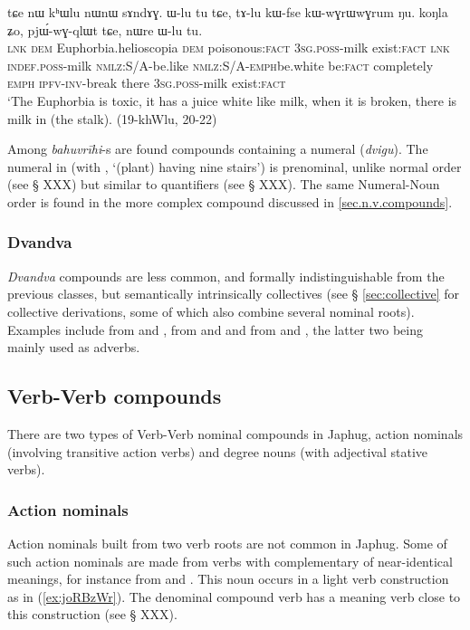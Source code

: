 \begin{exe}
\ex \label{ex:khWlu}  
\gll tɕe nɯ kʰɯlu nɯnɯ sɤndɤɣ. ɯ-lu tu tɕe, tɤ-lu kɯ-fse kɯ-wɣrɯ\redp{}wɣrum ŋu. koŋla ʑo, pjɯ́-wɣ-qlɯt tɕe, nɯre ɯ-lu tu. \\
\textsc{lnk} \textsc{dem} Euphorbia.helioscopia \textsc{dem} poisonous:\textsc{fact} \textsc{3sg.poss}-milk exist:\textsc{fact} \textsc{lnk}  \textsc{indef.poss}-milk \textsc{nmlz}:S/A-be.like \textsc{nmlz}:S/A-\textsc{emph}\redp{}be.white be:\textsc{fact} completely \textsc{emph} \textsc{ipfv}-\textsc{inv}-break there \textsc{3sg.poss}-milk exist:\textsc{fact} \\
\glt `The Euphorbia is toxic, it has a juice white like milk, when it is broken, there is milk in (the stalk). (19-khWlu, 20-22)
\end{exe}
Among \textit{bahuvrīhi}-s are found compounds containing a numeral (\textit{dvigu}). The numeral  in  (with , `(plant) having nine stairs') is prenominal, unlike normal order (see § XXX) but similar to quantifiers (see § XXX). The same Numeral-Noun order is found in the more complex compound  discussed in \ref{sec.n.v.compounds}.

\subsubsection{Dvandva} \label{sec:dvandva.n.n}
\textit{Dvandva} compounds are less common, and formally indistinguishable from the previous classes, but semantically intrinsically collectives (see § \ref{sec:collective} for collective derivations, some of which also combine several nominal roots). Examples include  from  and ,  from  and  and  from  and , the latter two being mainly used as adverbs.


\subsection{Verb-Verb compounds} \label{sec.v.v.compounds}
There are two types of Verb-Verb nominal compounds in Japhug, action nominals (involving transitive action verbs) and degree nouns (with adjectival stative verbs).

\subsubsection{Action nominals} \label{sec.v.v.compounds.action}
Action nominals built from two verb roots are not common in Japhug. Some of such action nominals are made from verbs with complementary of near-identical meanings, for instance  from  and . This noun occurs in a light verb construction as in (\ref{ex:joRBzWr}). The denominal compound verb   has a meaning verb close to this construction (see § XXX).

